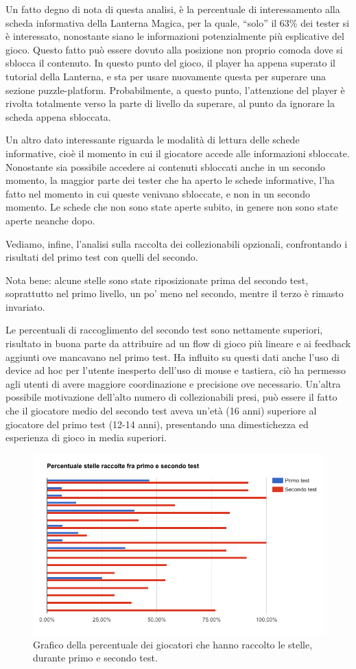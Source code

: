 Un fatto degno di nota di questa analisi, è la percentuale di interessamento alla scheda informativa della Lanterna Magica, per la quale, ``solo'' il 63\% dei tester si è interessato, nonostante siano le informazioni potenzialmente più esplicative del gioco. Questo fatto può essere dovuto alla posizione non proprio comoda dove si sblocca il contenuto. In questo punto del gioco, il player ha appena superato il tutorial della Lanterna, e sta per usare nuovamente questa per superare una sezione puzzle-platform. Probabilmente, a questo punto, l'attenzione del player è rivolta totalmente verso la parte di livello da superare, al punto da ignorare la scheda appena sbloccata.

Un altro dato interessante riguarda le modalità di lettura delle schede informative, cioè il momento in cui il giocatore accede alle informazioni sbloccate. Nonostante sia possibile accedere ai contenuti sbloccati anche in un secondo momento, la maggior parte dei tester che ha aperto le schede informative, l'ha fatto nel momento in cui queste venivano sbloccate, e non in un secondo momento. Le schede che non sono state aperte subito, in genere non sono state aperte neanche dopo.

Vediamo, infine, l'analisi sulla raccolta dei collezionabili opzionali, confrontando i risultati del primo test con quelli del secondo.

Nota bene: alcune stelle sono state riposizionate prima del secondo test, soprattutto nel primo livello, un po' meno nel secondo, mentre il terzo è rimasto invariato.

Le percentuali di raccoglimento del secondo test sono nettamente superiori, risultato in buona parte da attribuire ad un flow di gioco più lineare e ai feedback aggiunti ove mancavano nel primo test. Ha influito su questi dati anche l'uso di device ad hoc per l'utente inesperto dell'uso di mouse e tastiera, ciò ha permesso agli utenti di avere maggiore coordinazione e precisione ove necessario. Un'altra possibile motivazione dell'alto numero di collezionabili presi, può essere il fatto che il giocatore medio del secondo test aveva un'età (16 anni) superiore al giocatore del primo test (12-14 anni), presentando una dimestichezza ed esperienza di gioco in media superiori.

\begin{figure}[h]
\centerline{\includegraphics[scale=0.5]{images/risultati/test-stelle.png}}
\caption{Grafico della percentuale dei giocatori che hanno raccolto le stelle, durante primo e secondo test.}
\label{fig:test-stelle}
\end{figure}

\newpage